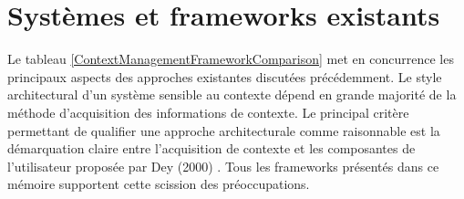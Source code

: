 \section{Systèmes et frameworks existants}

Le tableau \ref{ContextManagementFrameworkComparison} met en concurrence les
principaux aspects des approches existantes discutées précédemment. Le style
architectural d'un système sensible au contexte dépend en grande majorité de la
méthode d'acquisition des informations de contexte. Le principal critère
permettant de qualifier une approche architecturale comme raisonnable est la
démarquation claire entre l'acquisition de contexte et les composantes de
l'utilisateur proposée par Dey (2000) \cite{dey_providing_2000}. Tous les
frameworks présentés dans ce mémoire supportent cette scission des
préoccupations.

